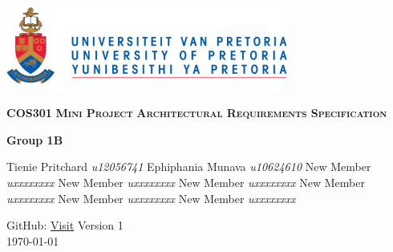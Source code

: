 \begin{titlepage}
\begin{center}
\includegraphics[width=350px]{University_of_Pretoria_Logo.png}
\newline
\newline


\begin{flushright} \large
\textbf {\textsc{\LARGE COS301}}\newline
\textbf {\textsc{\LARGE Mini Project}}\newline
\textbf {\textsc{\LARGE Architectural Requirements Specification}}\newline
\end{flushright}



\textbf{Group 1B} \\
\begin{flushright} \large
Tienie Pritchard \emph{u12056741} \newline
Ephiphania Munava \emph{u10624610} \newline
New Member \emph{uxxxxxxxx} \newline
New Member \emph{uxxxxxxxx} \newline
New Member \emph{uxxxxxxxx} \newline
New Member \emph{uxxxxxxxx} \newline
New Member \emph{uxxxxxxxx} \newline
New Member \emph{uxxxxxxxx} \newline 
\newline 
\newline
\end{flushright}
GitHub: \href{https://github.com/davidbreetzke/COS_301_Phase2_1B}{Visit}
\vfill
{\large Version 1}
\\
{\large \today}

\end{center}
\end{titlepage}

